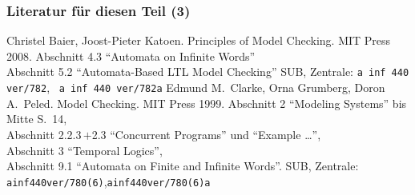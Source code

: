    \begin{frame}
      \frametitle{Literatur für diesen Teil (3)}
      \begin{small}
        \begin{thebibliography}{99}
            Christel Baier, Joost-Pieter Katoen.
            \newblock
            Principles of Model Checking.
            \newblock
            MIT Press 2008.
            \newblock
            Abschnitt 4.3 "`Automata on Infinite Words"'\\
            Abschnitt 5.2 "`Automata-Based LTL Model Checking"'
            \newblock
            SUB, Zentrale:
            \texttt{a inf 440 ver/782},~ \texttt{a inf 440 ver/782a}
            Edmund M.\ Clarke, Orna Grumberg, Doron A.\ Peled.
            \newblock
            Model Checking.
            \newblock
            MIT Press 1999.
            \newblock
            Abschnitt 2 "`Modeling Systems"' bis Mitte S.\ 14,\\
            Abschnitt 2.2.3\,$+$2.3 "`Concurrent Programs"' und "`Example \dots"',\\
            Abschnitt 3 "`Temporal Logics"',\\
            Abschnitt 9.1 "`Automata on Finite and Infinite Words"'.%
            \newblock
            SUB, Zentrale:
            \texttt{a\hfill inf\hfill 440\hfill ver/780(6)},\hfill\hfill  \texttt{a\hfill inf\hfill 440\hfill ver/780(6)a}
        \end{thebibliography}
        \par
      \end{small}
      \note{~}
    \end{frame}

% 
% 
  

